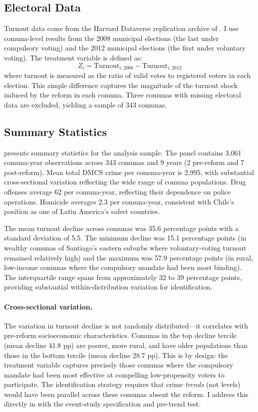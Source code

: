\documentclass[12pt]{article}
\begin{document}
\subsection{Electoral Data}

Turnout data come from the Harvard Dataverse replication archive of \citet{Cox2022}. I use comuna-level results from the 2008 municipal elections (the last under compulsory voting) and the 2012 municipal elections (the first under voluntary voting). The treatment variable is defined as:
\begin{equation}
Z_i = \text{Turnout}_{i,2008} - \text{Turnout}_{i,2012}
\end{equation}
where turnout is measured as the ratio of valid votes to registered voters in each election. This simple difference captures the magnitude of the turnout shock induced by the reform in each comuna. Three comunas with missing electoral data are excluded, yielding a sample of 343 comunas.

\subsection{Summary Statistics}

 presents summary statistics for the analysis sample. The panel contains 3,061 comuna-year observations across 343 comunas and 9 years (2 pre-reform and 7 post-reform). Mean total DMCS crime per comuna-year is 2,995, with substantial cross-sectional variation reflecting the wide range of comuna populations. Drug offenses average 62 per comuna-year, reflecting their dependence on police operations. Homicide averages 2.3 per comuna-year, consistent with Chile's position as one of Latin America's safest countries.

The mean turnout decline across comunas was 35.6 percentage points with a standard deviation of 5.5. The minimum decline was 15.1 percentage points (in wealthy comunas of Santiago's eastern suburbs where voluntary-voting turnout remained relatively high) and the maximum was 57.9 percentage points (in rural, low-income comunas where the compulsory mandate had been most binding). The interquartile range spans from approximately 32 to 39 percentage points, providing substantial within-distribution variation for identification.

\paragraph{Cross-sectional variation.} The variation in turnout decline is not randomly distributed---it correlates with pre-reform socioeconomic characteristics. Comunas in the top decline tercile (mean decline 41.8 pp) are poorer, more rural, and have older populations than those in the bottom tercile (mean decline 28.7 pp). This is by design: the treatment variable captures precisely those comunas where the compulsory mandate had been most effective at compelling low-propensity voters to participate. The identification strategy requires that crime \textit{trends} (not levels) would have been parallel across these comunas absent the reform. I address this directly in  with the event-study specification and pre-trend test.
\end{document}
